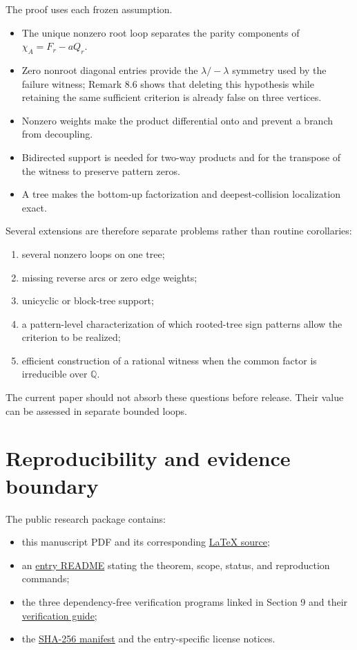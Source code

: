 \documentclass[11pt]{article}
\theoremstyle{remark}
\begin{document}
The proof uses each frozen assumption.

\begin{itemize}
\item The unique nonzero root loop separates the parity components of $\chi_A=F_r-aQ_r$.
\item Zero nonroot diagonal entries provide the $\lambda/-\lambda$ symmetry used by the failure witness; Remark 8.6 shows that deleting this hypothesis while retaining the same sufficient criterion is already false on three vertices.
\item Nonzero weights make the product differential onto and prevent a branch from decoupling.
\item Bidirected support is needed for two-way products and for the transpose of the witness to preserve pattern zeros.
\item A tree makes the bottom-up factorization and deepest-collision localization exact.
\end{itemize}


Several extensions are therefore separate problems rather than routine corollaries:

\begin{enumerate}
\item several nonzero loops on one tree;
\item missing reverse arcs or zero edge weights;
\item unicyclic or block-tree support;
\item a pattern-level characterization of which rooted-tree sign patterns allow the criterion to be realized;
\item efficient construction of a rational witness when the common factor is irreducible over $\mathbb Q$.
\end{enumerate}


The current paper should not absorb these questions before release. Their value can be assessed in separate bounded loops.

\section{Reproducibility and evidence boundary}


The public research package contains:

\begin{itemize}
\item this manuscript PDF and its corresponding \href{nssp-root-loop-trees.tex}{LaTeX source};
\item an \href{README.md}{entry README} stating the theorem, scope, status, and reproduction commands;
\item the three dependency-free verification programs linked in Section 9 and their \href{verification/README.md}{verification guide};
\item the \href{SHA256SUMS.txt}{SHA-256 manifest} and the entry-specific license notices.
\end{itemize}
\end{document}
